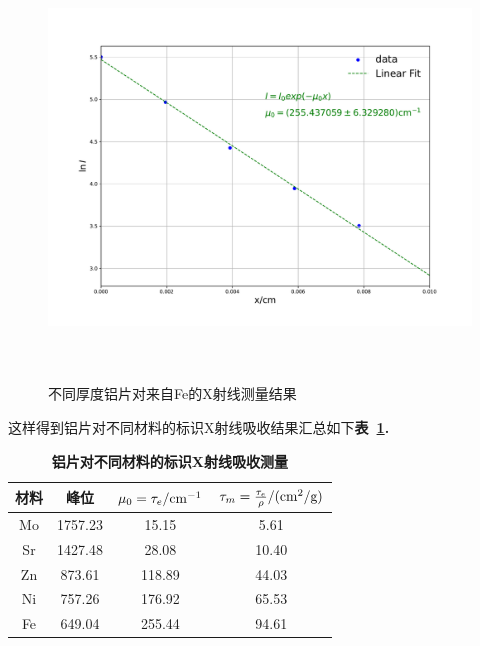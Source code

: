 \documentclass[a4paper]{article}
\begin{document}
\begin{figure}[H]
 \centering
 \caption{不同厚度铝片对来自Fe的X射线测量结果}
 \includegraphics[height=10.5cm, width=14cm]{images/phyex2_fig5.pdf}
 \label{fig:fig6}
\end{figure}
这样得到铝片对不同材料的标识X射线吸收结果汇总如下\textbf{表~\ref{tab:table2}.}
\begin{table}[H]
\caption{\textbf{铝片对不同材料的标识X射线吸收测量}}
\label{tab:table2}
\begin{center}
\setlength{\tabcolsep}{7mm}
\begin{tabular}{|c|c|c|c|}%
    \toprule
	\hline
	材料 & 峰位 & $\mu_0=\tau_e/\rm cm^{-1}$ & $\tau_m=\frac{\tau_e}{\rho}/\rm (cm^2/g)$ \\ \hline \hline
	Mo & 1757.23 & 15.15 & 5.61 \\ \hline
	Sr & 1427.48 & 28.08 & 10.40 \\ \hline
	Zn & 873.61 & 118.89 & 44.03 \\ \hline
	Ni & 757.26 & 176.92 & 65.53 \\ \hline
	Fe & 649.04 & 255.44 & 94.61 \\ \hline
	\bottomrule
	\end{tabular}
\end{center}
\end{table}
\end{document}

